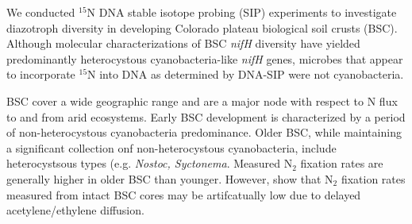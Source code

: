 We conducted $^{15}$N DNA stable isotope probing (SIP) experiments to investigate diazotroph diversity in developing Colorado plateau biological soil crusts (BSC). Although molecular characterizations of BSC \textit{nifH} diversity have yielded predominantly heterocystous cyanobacteria-like \textit{nifH} genes, microbes that appear to incorporate $^{15}$N into DNA as determined by DNA-SIP were not cyanobacteria.

BSC cover a wide geographic range and are a major node with respect to N flux to and from arid ecosystems. Early BSC development is characterized by a period of non-heterocystous cyanobacteria predominance. Older BSC, while maintaining a significant collection onf non-heterocystous cyanobacteria, include heterocystsous types (e.g. \textit{Nostoc, Syctonema}. Measured N$_{2}$ fixation rates are generally higher in older BSC than younger. However, \cite{15643930} show that N$_{2}$ fixation rates measured from intact BSC cores may be artifcatually low due to delayed acetylene/ethylene diffusion. 


